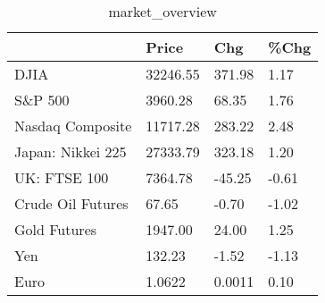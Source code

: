 \documentclass{article}%
\begin{document}
%


\begin{table}[htbp]%
\caption{market\_overview}%
\centering%
\begin{adjustbox}{width=1\textwidth}%
\begin{tabular}{llll}
\toprule
                  &    Price &    Chg &  \%Chg \\
\midrule
             DJIA & 32246.55 & 371.98 &  1.17 \\
          S\&P 500 &  3960.28 &  68.35 &  1.76 \\
 Nasdaq Composite & 11717.28 & 283.22 &  2.48 \\
Japan: Nikkei 225 & 27333.79 & 323.18 &  1.20 \\
     UK: FTSE 100 &  7364.78 & -45.25 & -0.61 \\
Crude Oil Futures &    67.65 &  -0.70 & -1.02 \\
     Gold Futures &  1947.00 &  24.00 &  1.25 \\
              Yen &   132.23 &  -1.52 & -1.13 \\
             Euro &   1.0622 & 0.0011 &  0.10 \\
\bottomrule
\end{tabular}
%
\end{adjustbox}%
\end{table}

%
\end{document}
